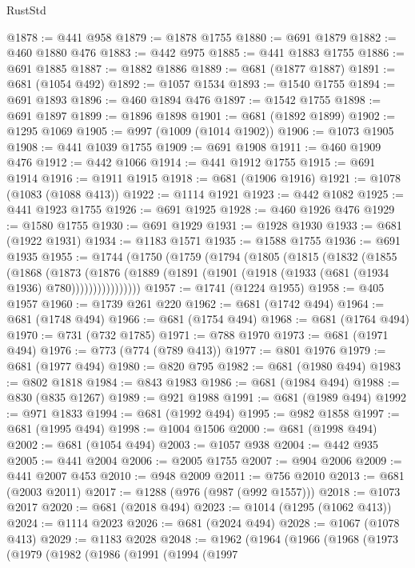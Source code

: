 \begin{lexlean}{RustStd}
\begin{coremodule}
@1878 := @441 @958
@1879 := @1878 @1755
@1880 := @691 @1879
@1882 := @460 @1880 @476
@1883 := @442 @975
@1885 := @441 @1883 @1755
@1886 := @691 @1885
@1887 := @1882 @1886
@1889 := @681 (@1877 @1887)
@1891 := @681 (@1054 @492)
@1892 := @1057 @1534
@1893 := @1540 @1755
@1894 := @691 @1893
@1896 := @460 @1894 @476
@1897 := @1542 @1755
@1898 := @691 @1897
@1899 := @1896 @1898
@1901 := @681 (@1892 @1899)
@1902 := @1295 @1069
@1905 := @997 (@1009 (@1014 @1902))
@1906 := @1073 @1905
@1908 := @441 @1039 @1755
@1909 := @691 @1908
@1911 := @460 @1909 @476
@1912 := @442 @1066
@1914 := @441 @1912 @1755
@1915 := @691 @1914
@1916 := @1911 @1915
@1918 := @681 (@1906 @1916)
@1921 := @1078 (@1083 (@1088 @413))
@1922 := @1114 @1921
@1923 := @442 @1082
@1925 := @441 @1923 @1755
@1926 := @691 @1925
@1928 := @460 @1926 @476
@1929 := @1580 @1755
@1930 := @691 @1929
@1931 := @1928 @1930
@1933 := @681 (@1922 @1931)
@1934 := @1183 @1571
@1935 := @1588 @1755
@1936 := @691 @1935
@1955 := @1744
    (@1750
      (@1759
        (@1794
          (@1805
            (@1815
              (@1832
                (@1855
                  (@1868
                    (@1873
                      (@1876
                        (@1889 (@1891 (@1901 (@1918 (@1933 (@681 (@1934 @1936) @780))))))))))))))))
@1957 := @1741 (@1224 @1955)
@1958 := @405 @1957
@1960 := @1739 @261 @220
@1962 := @681 (@1742 @494)
@1964 := @681 (@1748 @494)
@1966 := @681 (@1754 @494)
@1968 := @681 (@1764 @494)
@1970 := @731 (@732 @1785)
@1971 := @788 @1970
@1973 := @681 (@1971 @494)
@1976 := @773 (@774 (@789 @413))
@1977 := @801 @1976
@1979 := @681 (@1977 @494)
@1980 := @820 @795
@1982 := @681 (@1980 @494)
@1983 := @802 @1818
@1984 := @843 @1983
@1986 := @681 (@1984 @494)
@1988 := @830 (@835 @1267)
@1989 := @921 @1988
@1991 := @681 (@1989 @494)
@1992 := @971 @1833
@1994 := @681 (@1992 @494)
@1995 := @982 @1858
@1997 := @681 (@1995 @494)
@1998 := @1004 @1506
@2000 := @681 (@1998 @494)
@2002 := @681 (@1054 @494)
@2003 := @1057 @938
@2004 := @442 @935
@2005 := @441 @2004
@2006 := @2005 @1755
@2007 := @904 @2006
@2009 := @441 @2007 @453
@2010 := @948 @2009
@2011 := @756 @2010
@2013 := @681 (@2003 @2011)
@2017 := @1288 (@976 (@987 (@992 @1557)))
@2018 := @1073 @2017
@2020 := @681 (@2018 @494)
@2023 := @1014 (@1295 (@1062 @413))
@2024 := @1114 @2023
@2026 := @681 (@2024 @494)
@2028 := @1067 (@1078 @413)
@2029 := @1183 @2028
@2048 := @1962
    (@1964
      (@1966
        (@1968
          (@1973
            (@1979
              (@1982
                (@1986
                  (@1991
                    (@1994
                      (@1997

\end{coremodule}
\end{lexlean}
